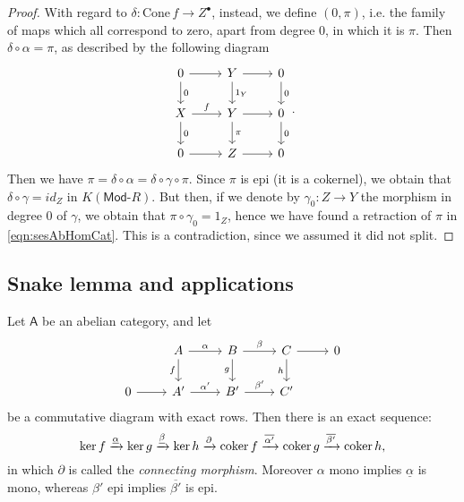 \begin{proof}
	With regard to $\delta\colon \mathrm{Cone}\, f \to Z^\bullet$, instead, we define $(0, \pi)$, i.e.
	the family of maps which all correspond to zero, apart from degree $0$, in which it is $\pi$.
	Then $\delta \circ \alpha = \pi$, as described by the following diagram
	\begin{equation}
	\begin{tikzcd}
		0 \arrow[r, "", rightarrow] \arrow[d, "0", rightarrow] &
		Y \arrow[r, "", rightarrow] \arrow[d, "1_Y", rightarrow] &
		0 \arrow[d, "0", rightarrow] \\
		X \arrow[r, "f", rightarrow] \arrow[d, "0", rightarrow] &
		Y \arrow[r, "", rightarrow] \arrow[d, "\pi", rightarrow] &
		0 \arrow[d, "0", rightarrow] \\
		0 \arrow[r, "", rightarrow] &
		Z \arrow[r, "", rightarrow] &
		0
	\end{tikzcd}
	.\end{equation} 
	Then we have $\pi = \delta \circ \alpha = \delta \circ \gamma \circ \pi$.
	Since $\pi$ is epi (it is a cokernel), we obtain that
	$\delta \circ \gamma = id_Z$ in $K(\mathsf{Mod}\text{-}R)$.
	But then, if we denote by $\gamma_0\colon Z \to Y$ the morphism in degree $0$ of $\gamma$, we obtain
	that $\pi \circ \gamma_0 = 1_Z$, hence we have found a retraction of $\pi$ in \eqref{eqn:sesAbHomCat}.
	This is a contradiction, since we assumed it did not split.
\end{proof}

\subsection{Snake lemma and applications}
\begin{lem}
	Let $\mathsf{A}$ be an abelian category, and let
	\begin{equation}
	\begin{tikzcd}
		&
		A \arrow[r, "\alpha", rightarrow] \arrow[d, "f"', rightarrow] &
		B \arrow[r, "\beta", rightarrow] \arrow[d, "g"', rightarrow] &
		C \arrow[r, "", rightarrow] \arrow[d, "h"', rightarrow] &
		0 \\
		0 \arrow[r, "", rightarrow] &
		A' \arrow[r, "\alpha'", rightarrow] &
		B' \arrow[r, "\beta'", rightarrow] &
		C' &
	\end{tikzcd}
	\end{equation} 
	be a commutative diagram with exact rows.
	Then there is an exact sequence:
	\begin{equation}
	\ker f \xrightarrow{\underline{\alpha}} \ker g \xrightarrow{\underline{\beta}}
	\ker h \xrightarrow{\partial} \operatorname{coker} f \xrightarrow{\overline{\alpha'}} 
	\operatorname{coker} g \xrightarrow{\overline{\beta'}} \operatorname{coker} h
	,\end{equation} 
	in which $\partial$ is called the {\em connecting morphism}.
	Moreover $\alpha$ mono implies $\underline{\alpha}$ is mono,
	whereas $\beta'$ epi implies $\overline{\beta'}$ is epi.
\end{lem} 	

